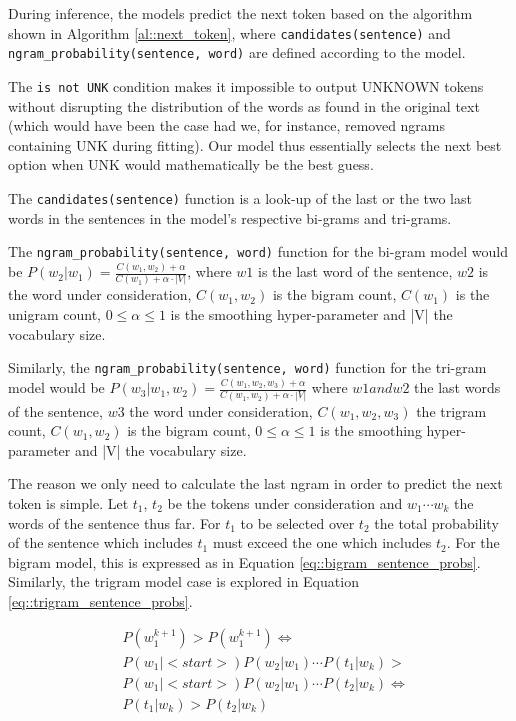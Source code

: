 \documentclass[11pt, a4paper]{article}
\begin{document}
	During inference, the models predict the next token based on the algorithm shown in Algorithm \ref{al::next_token}, where \texttt{candidates(sentence)} and \texttt{ngram\_probability(sentence, word)} are defined according to the model. 
	
	The \texttt{is not UNK} condition makes it impossible to output UNKNOWN tokens without disrupting the distribution of the words as found in the original text (which would have been the case had we, for instance, removed ngrams containing UNK during fitting). Our model thus essentially selects the next best option when UNK would mathematically be the best guess.
	
	The \texttt{candidates(sentence)} function is a look-up of the last or the two last words in the sentences in the model's respective bi-grams and tri-grams.
	
	The \texttt{ngram\_probability(sentence, word)} function for the bi-gram model would be $ P(w_2|w_1) = \frac{C(w_1,w_2) + \alpha}{C(w_1) + \alpha \cdot|V|} $, where  $w1$ is the last word of the sentence, $w2$ is the word under consideration, $ C(w_1,w_2) $ is the bigram count, $ C(w_1) $ is the unigram count, $ 0 \leq\alpha \leq1 $ is the smoothing hyper-parameter and |V| the vocabulary size.
	
	Similarly, the \texttt{ngram\_probability(sentence, word)} function for the tri-gram model would be $ P(w_3|w_1,w_2) = \frac{C(w_1,w_2,w_3) + \alpha}{C(w_1,w_2) + \alpha \cdot |V|} $ where  $w1 and w2$ the last words of the sentence, $w3$ the word under consideration, $ C(w_1,w_2,w_3) $ the trigram count, $ C(w_1,w_2) $ is the bigram count, $ 0 \leq\alpha \leq1 $ is the smoothing hyper-parameter and |V| the vocabulary size.
	
	The reason we only need to calculate the last ngram in order to predict the next token is simple. Let $t_1$, $t_2$ be the tokens under consideration and $w_1 \cdots w_k$ the words of the sentence thus far. For $t_1$ to be selected over $t_2$ the total probability of the sentence which includes $t_1$ must exceed the one which includes $t_2$. For the bigram model, this is expressed as in Equation \ref{eq::bigram_sentence_probs}. Similarly, the trigram model case is explored in Equation \ref{eq::trigram_sentence_probs}. 
	
	\begin{equation}
		\label{eq::bigram_sentence_probs}
		\begin{aligned}
			& P(w^{k+1}_1) > P(w^{k+1}_1) \iff \\
			& P(w_1|<start>) P(w_2|w_1) \cdots P(t_1|w_k) > \\
			& P(w_1|<start>) P(w_2|w_1) \cdots P(t_2|w_k) \iff \\
			& P(t_1|w_k) > P(t_2|w_k)
		\end{aligned}
	\end{equation}
	
\end{document}

